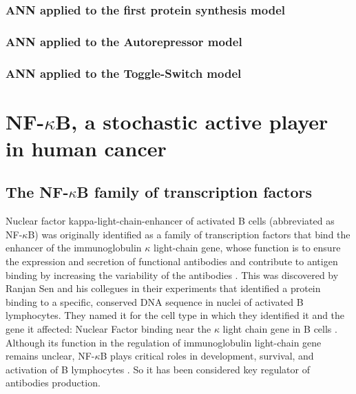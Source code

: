 \documentclass[12pt,a4paper]{report}
\begin{document}
\section{ANN applied to the first protein synthesis model}
\section{ANN applied to the Autorepressor model}
\section{ANN applied to the Toggle-Switch model}

\part{NF-\texorpdfstring{$\kappa$}{}B, a stochastic active player in human cancer}
\chapter{The NF-\texorpdfstring{$\kappa$}{}B family of transcription factors}



Nuclear factor kappa-light-chain-enhancer of activated B cells (abbreviated as NF-$\kappa$B) was originally identified as a family of transcription factors that bind the enhancer of the immunoglobulin $\kappa$ light-chain gene, whose function is to ensure the expression and secretion of functional antibodies and contribute to antigen binding by increasing the variability of the antibodies \cite{immunoglobulin}. This was discovered by Ranjan Sen and his collegues in their experiments that identified a protein binding to a specific, conserved DNA sequence in nuclei of activated B lymphocytes. They named it for the cell type in which they identified it and the gene it affected: Nuclear Factor binding near the $\kappa$ light chain gene in B cells \cite{nfkb30years}. Although its function in the regulation of immunoglobulin light-chain gene remains unclear, NF-$\kappa$B plays critical roles in development, survival, and activation of B lymphocytes \cite{Immuno}. So it has been considered key regulator of antibodies production. 
\end{document}
